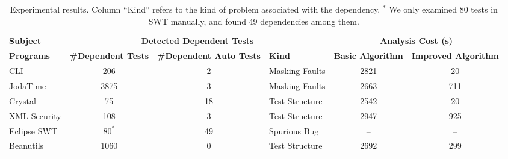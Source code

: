 \newcommand{\masking}{Masking Faults}
\newcommand{\initializaiton}{Test Structure} %
\newcommand{\spurious}{Spurious Bug}

\begin{table*}
\centering
\setlength{\tabcolsep}{0.5\tabcolsep}
\begin{tabular}{|l||c|c|l||c|c|}
\hline
\textbf{Subject} & \multicolumn{3}{|c||}{\textbf{Detected Dependent Tests}} & \multicolumn{2}{|c|}{\textbf{Analysis Cost (s)}}\\
\cline{2-6}
\textbf{Programs} & \textbf{\#Dependent Tests} & \textbf{\#Dependent Auto Tests} &
\textbf{Kind} &
\textbf{Basic Algorithm} & \textbf{Improved Algorithm}
\\
\hline
CLI & 206 
& 2 & \masking{}& 2821& 20  \\
JodaTime & 3875 
& 3 & \masking{} & 2663 & 711  \\
Crystal & 75 & 18 &\initializaiton{} & 2542 & 20 \\
XML Security & 108 & 3 & \initializaiton{}& 2947 & 925  \\ %
Eclipse SWT & $80^*$ 
& 49 & \spurious{} & -- & -- 
\\
Beanutils & 1060 & 0 & \initializaiton{} & 2692 & 299 \\
\hline
\end{tabular}
\caption{Experimental results. Column ``Kind'' refers to the kind
of problem associated with the dependency. ${}^*$ We only examined 80
tests in SWT manually, and found 49 dependencies among them.%
}
\label{fig:results}
\end{table*}
